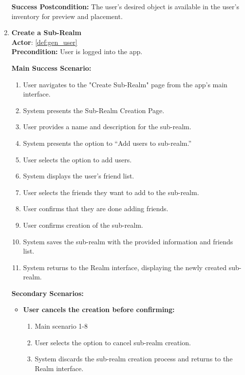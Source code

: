 \documentclass{article}
\begin{document}
\begin{enumerate}[label=\textbf{UC\arabic*}]
        \textbf{Success Postcondition:} The user’s desired object is available in the user’s inventory for preview and placement.


    \item \label{uc:17} \textbf{Create a Sub-Realm} \\
        \textbf{Actor}: \ref{def:gen_user} \\
        \textbf{Precondition:} User is logged into the app.
    
        \textbf{Main Success Scenario:}
        \begin{enumerate}[label=\textbf{\arabic*.}]
            \item User navigates to the "Create Sub-Realm" page from the app’s main interface.
            \item System presents the Sub-Realm Creation Page.
            \item User provides a name and description for the sub-realm.
            \item System presents the option to “Add users to sub-realm.”
            \item User selects the option to add users.
            \item System displays the user’s friend list.
            \item User selects the friends they want to add to the sub-realm.
            \item User confirms that they are done adding friends.
            \item User confirms creation of the sub-realm.
            \item System saves the sub-realm with the provided information and friends list.
            \item System returns to the Realm interface, displaying the newly created sub-realm.
        \end{enumerate}
        
        \textbf{Secondary Scenarios:}
        \begin{itemize}
            \item[{}] \textbf{User cancels the creation before confirming:}
            \begin{enumerate}[label=\textbf{\arabic*.}]
                \item Main scenario 1-8
                \item User selects the option to cancel sub-realm creation.
                \item System discards the sub-realm creation process and returns to the Realm interface.
            \end{enumerate}
            

\end{itemize}
\end{enumerate}
\end{document}
